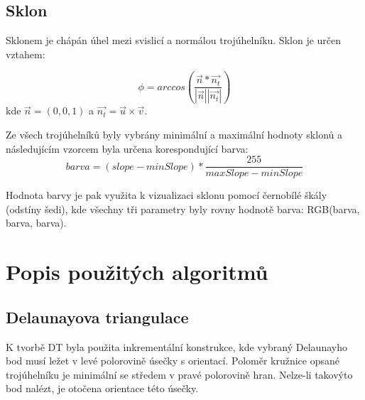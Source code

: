 \documentclass[oneside,12pt,a4paper]{book}
\begin{document}
\section{Sklon}
Sklonem je chápán úhel mezi svislicí a normálou trojúhelníku. Sklon je určen vztahem:\par
\begin{equation}
    \phi = arccos(\frac{\Vec{n}*\Vec{n_t}}{|\Vec{n}||\Vec{n_t}|})
\end{equation}
kde $\Vec{n} = (0,0,1)$ a $\Vec{n_t}=\Vec{u} \times \Vec{v}$.\par

Ze všech trojúhelníků byly vybrány minimální a maximální hodnoty sklonů a následujícím vzorcem byla určena korespondující barva:
\begin{equation}
    barva =(slope - minSlope)*\frac{255}{maxSlope-minSlope}
\end{equation}

Hodnota barvy je pak využita k vizualizaci sklonu pomocí černobílé škály (odstíny šedi), kde všechny tři parametry byly rovny hodnotě barva: RGB(barva, barva, barva).


\chapter{Popis použitých algoritmů}
\label{kapitola: Popis použitých algoritmů}

\section{Delaunayova triangulace}
K tvorbě DT byla použita inkrementální konstrukce, kde vybraný Delaunayho bod musí ležet v levé polorovině úsečky s orientací. Poloměr kružnice opsané trojúhelníku je minimální se středem v pravé polorovině hran. Nelze-li takovýto bod nalézt, je otočena orientace této úsečky.\par
\end{document}
